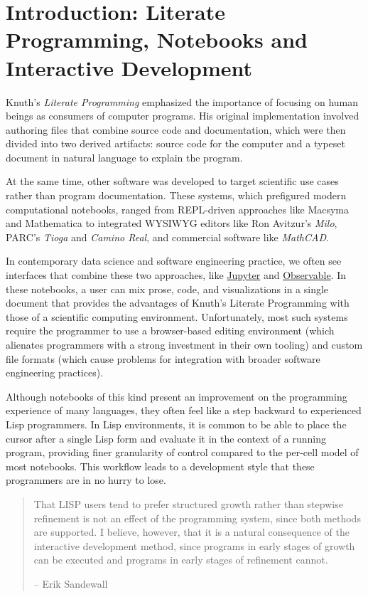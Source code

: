 \documentclass[sigconf,screen]{acmart}
\begin{document}
\hypertarget{id}{%
\section{Introduction: Literate Programming, Notebooks and Interactive Development}\label{id}}

Knuth's \emph{Literate Programming}  emphasized the importance of focusing on human beings as consumers of computer programs. His original implementation involved authoring files that combine source code and documentation, which were then divided into two derived artifacts: source code for the computer and a typeset document in natural language to explain the program.

At the same time, other software was developed to target scientific use cases rather than program documentation. These systems, which prefigured modern computational notebooks, ranged from REPL-driven approaches like Macsyma and Mathematica to integrated WYSIWYG editors like Ron Avitzur's \emph{Milo}, PARC's \emph{Tioga} and \emph{Camino Real}, and commercial software like \emph{MathCAD}.

In contemporary data science and software engineering practice, we often see interfaces that combine these two approaches, like \href{https://jupyter.org}{Jupyter} and \href{https://observablehq.com}{Observable}. In these notebooks, a user can mix prose, code, and visualizations in a single document that provides the advantages of Knuth's Literate Programming with those of a scientific computing environment. Unfortunately, most such systems require the programmer to use a browser-based editing environment (which alienates programmers with a strong investment in their own tooling) and custom file formats (which cause problems for integration with broader software engineering practices).

Although notebooks of this kind present an improvement on the programming experience of many languages, they often feel like a step backward to experienced Lisp programmers. In Lisp environments, it is common to be able to place the cursor after a single Lisp form and evaluate it in the context of a running program, providing finer granularity of control compared to the per-cell model of most notebooks. This workflow leads to a development style that these programmers are in no hurry to lose.

\begin{quote}
That LISP users tend to prefer structured growth rather than stepwise refinement is not an effect of the programming system, since both methods are supported. I believe, however, that it is a natural consequence of the interactive development method, since programs in early stages of growth can be executed and programs in early stages of refinement cannot.

-- Erik Sandewall
\end{quote}
\end{document}
